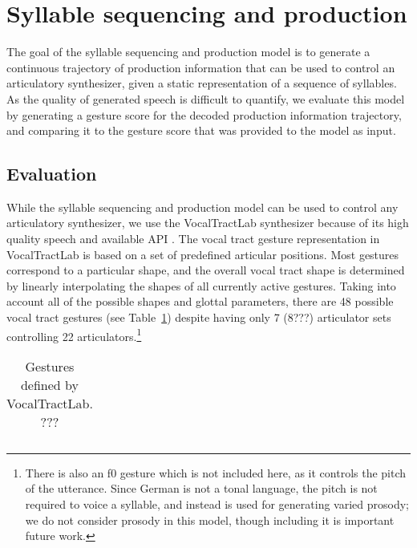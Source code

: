 \section{Syllable sequencing and production}
\label{sec:results-production}

The goal of the syllable sequencing and production model
is to generate a continuous trajectory
of production information
that can be used to control
an articulatory synthesizer,
given a static representation
of a sequence of syllables.
As the quality of generated speech
is difficult to quantify,
we evaluate this model
by generating a gesture score
for the decoded production information trajectory,
and comparing it
to the gesture score that was provided
to the model as input.

\subsection{Evaluation}

While the syllable sequencing and production model
can be used to control any articulatory synthesizer,
we use the VocalTractLab synthesizer
because of its high quality speech
and available API \citep{birkholz2013}.
The vocal tract gesture representation
in VocalTractLab is based on a set of
predefined articular positions.
Most gestures correspond to
a particular shape,
and the overall vocal tract shape
is determined by linearly interpolating
the shapes of all currently active gestures.
Taking into account all of the
possible shapes and glottal parameters,
there are 48 possible vocal tract gestures
(see Table~\ref{tab:vtl-vtg}) despite having only
7 (8???) articulator sets
controlling 22 articulators.\footnote{
  There is also an f0 gesture which is not included here,
  as it controls the pitch of the utterance.
  Since German is not a tonal language,
  the pitch is not required to voice a syllable,
  and instead is used for generating
  varied prosody;
  we do not consider prosody in this model,
  though including it is important future work.}

\begin{table}[ht!]
  \begin{small}
    \begin{tabular}{}
    \end{tabular}
 \end{small}
  \caption[VocalTractLab gestures.]{
    Gestures defined by VocalTractLab. ???}
\label{tab:vtl-vtg}
\end{table}

